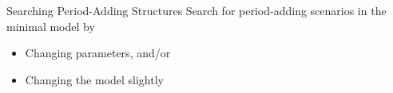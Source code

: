 %
%
%

\begin{frame}{Searching Period-Adding Structures}
    Search for period-adding scenarios in the minimal model by
    \begin{itemize}
        \item Changing parameters, and/or
        \item Changing the model slightly
    \end{itemize}

\end{frame}